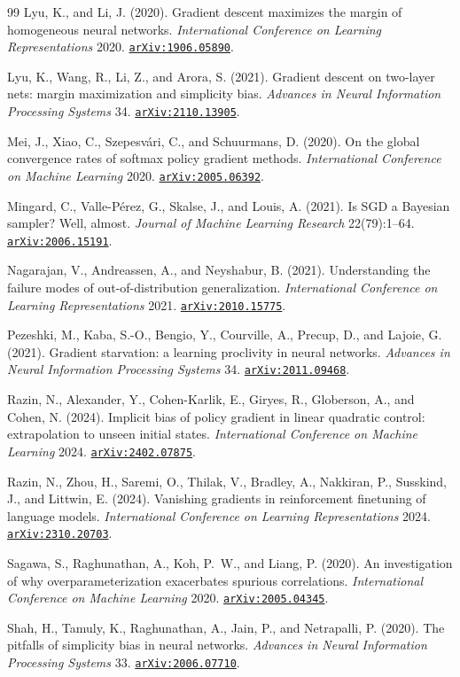 \documentclass[11pt]{amsart}
\newcommand{\arxiv}[1]{\href{https://arxiv.org/abs/#1}{\texttt{arXiv:#1}}}
\theoremstyle{plain}
\theoremstyle{definition}
\begin{document}
\begin{thebibliography}{99}
 Lyu, K., and Li, J. (2020). Gradient descent maximizes the margin of homogeneous neural networks. \emph{International Conference on Learning Representations} 2020. \arxiv{1906.05890}.

 Lyu, K., Wang, R., Li, Z., and Arora, S. (2021). Gradient descent on two-layer nets: margin maximization and simplicity bias. \emph{Advances in Neural Information Processing Systems} 34. \arxiv{2110.13905}.

 Mei, J., Xiao, C., Szepesv\'ari, C., and Schuurmans, D. (2020). On the global convergence rates of softmax policy gradient methods. \emph{International Conference on Machine Learning} 2020. \arxiv{2005.06392}.

 Mingard, C., Valle-P\'erez, G., Skalse, J., and Louis, A. (2021). Is SGD a Bayesian sampler? Well, almost. \emph{Journal of Machine Learning Research} 22(79):1--64. \arxiv{2006.15191}.

 Nagarajan, V., Andreassen, A., and Neyshabur, B. (2021). Understanding the failure modes of out-of-distribution generalization. \emph{International Conference on Learning Representations} 2021. \arxiv{2010.15775}.

 Pezeshki, M., Kaba, S.-O., Bengio, Y., Courville, A., Precup, D., and Lajoie, G. (2021). Gradient starvation: a learning proclivity in neural networks. \emph{Advances in Neural Information Processing Systems} 34. \arxiv{2011.09468}.

 Razin, N., Alexander, Y., Cohen-Karlik, E., Giryes, R., Globerson, A., and Cohen, N. (2024). Implicit bias of policy gradient in linear quadratic control: extrapolation to unseen initial states. \emph{International Conference on Machine Learning} 2024. \arxiv{2402.07875}.

 Razin, N., Zhou, H., Saremi, O., Thilak, V., Bradley, A., Nakkiran, P., Susskind, J., and Littwin, E. (2024). Vanishing gradients in reinforcement finetuning of language models. \emph{International Conference on Learning Representations} 2024. \arxiv{2310.20703}.

 Sagawa, S., Raghunathan, A., Koh, P.~W., and Liang, P. (2020). An investigation of why overparameterization exacerbates spurious correlations. \emph{International Conference on Machine Learning} 2020. \arxiv{2005.04345}.

 Shah, H., Tamuly, K., Raghunathan, A., Jain, P., and Netrapalli, P. (2020). The pitfalls of simplicity bias in neural networks. \emph{Advances in Neural Information Processing Systems} 33. \arxiv{2006.07710}.


\end{thebibliography}
\end{document}
